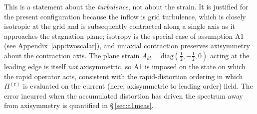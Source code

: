 \documentclass[lineno]{JFM-FLM_Au}
\begin{document}
This is a statement about the \emph{turbulence}, not about the strain. It is
justified for the present configuration because the inflow is grid turbulence,
which is closely isotropic at the grid and is subsequently contracted along a
single axis as it approaches the stagnation plane; isotropy is the special
case of assumption A1 (see Appendix~\ref{app:twoscalar}), and uniaxial contraction preserves axisymmetry about the
contraction axis. The plane strain $A_{kl}=\mathrm{diag}(\tfrac12,-\tfrac12,0)$
acting at the leading edge is itself \emph{not} axisymmetric, so A1 is imposed
on the state on which the rapid operator acts, consistent with the
rapid-distortion ordering in which $\Pi^{(\mathrm r)}$ is evaluated on the
current (here, axisymmetric to leading order) field. The error incurred when
the accumulated distortion has driven the spectrum away from axisymmetry is
quantified in \S\,\ref{sec:a1meas}.
\end{document}
